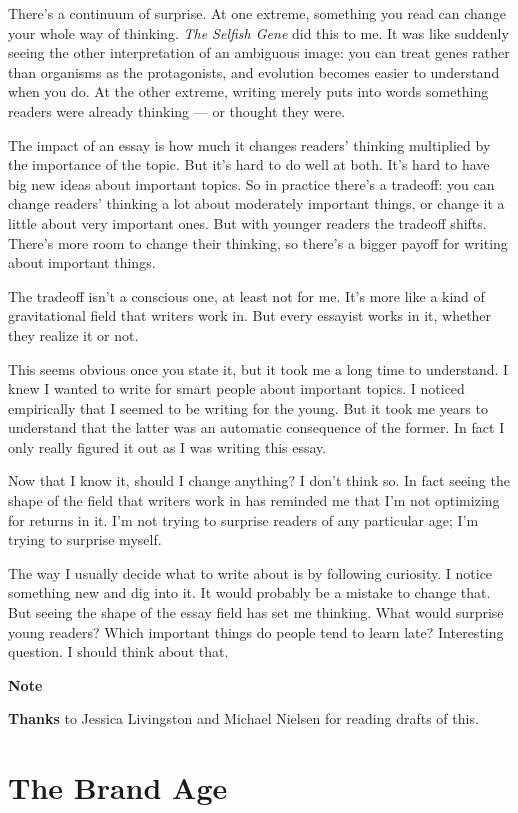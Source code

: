 \documentclass[12pt]{book}
\begin{document}
There's a continuum of surprise. At one extreme, something you read can
change your whole way of thinking. \emph{The Selfish Gene} did this to
me. It was like suddenly seeing the other interpretation of an ambiguous
image: you can treat genes rather than organisms as the protagonists,
and evolution becomes easier to understand when you do. At the other
extreme, writing merely puts into words something readers were already
thinking --- or thought they were.

The impact of an essay is how much it changes readers' thinking
multiplied by the importance of the topic. But it's hard to do well at
both. It's hard to have big new ideas about important topics. So in
practice there's a tradeoff: you can change readers' thinking a lot
about moderately important things, or change it a little about very
important ones. But with younger readers the tradeoff shifts. There's
more room to change their thinking, so there's a bigger payoff for
writing about important things.

The tradeoff isn't a conscious one, at least not for me. It's more like
a kind of gravitational field that writers work in. But every essayist
works in it, whether they realize it or not.

This seems obvious once you state it, but it took me a long time to
understand. I knew I wanted to write for smart people about important
topics. I noticed empirically that I seemed to be writing for the young.
But it took me years to understand that the latter was an automatic
consequence of the former. In fact I only really figured it out as I was
writing this essay.

Now that I know it, should I change anything? I don't think so. In fact
seeing the shape of the field that writers work in has reminded me that
I'm not optimizing for returns in it. I'm not trying to surprise readers
of any particular age; I'm trying to surprise myself.

The way I usually decide what to write about is by following curiosity.
I notice something new and dig into it. It would probably be a mistake
to change that. But seeing the shape of the essay field has set me
thinking. What would surprise young readers? Which important things do
people tend to learn late? Interesting question. I should think about
that.

\textbf{Note}

\textbf{Thanks} to Jessica Livingston and Michael Nielsen for reading
drafts of this.
\chapter{The Brand Age}
\end{document}

